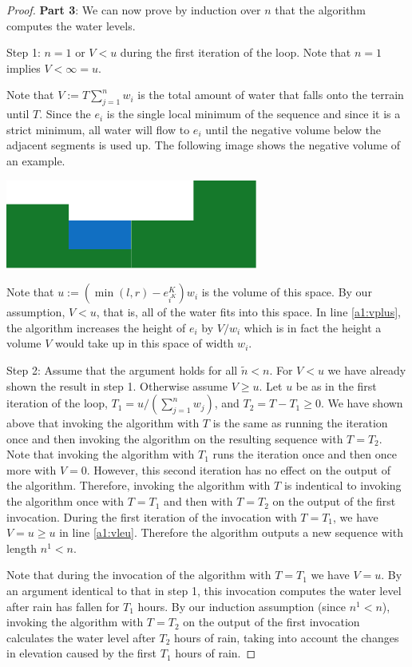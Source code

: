 \documentclass[11pt,a4paper]{article}
\begin{document}
\begin{proof}
\textbf{Part 3}: We can now prove by induction over $n$ that the algorithm computes the water levels.

Step 1: $n = 1$ or $V < u$ during the first iteration of the loop. Note that $n = 1$ implies $V < \infty = u$.

Note that $V := T\sum_{j=1}^n w_i$ is the total amount of water that falls onto the terrain until $T$.
Since the $e_i$ is the single local minimum of the sequence and since it is a strict minimum, all water will flow to $e_i$ until the negative volume below the adjacent segments is used up.
The following image shows the negative volume of an example.
\begin{center}
  \includegraphics{im6.pdf}
\end{center}
Note that $u := (\min(l, r)-e_{i^K}^K)w_i$ is the volume of this space.
By our assumption, $V < u$, that is, all of the water fits into this space.
In line \ref{a1:vplus}, the algorithm increases the height of $e_i$ by $V/w_i$ which is in fact the height a volume $V$ would take up in this space of width $w_i$.

Step 2: Assume that the argument holds for all $\tilde{n} < n$.
For $V < u$ we have already shown the result in step 1.
Otherwise assume $V \ge u$.
Let $u$ be as in the first iteration of the loop, $T_1 = u/(\sum_{j=1}^{n}w_j)$, and $T_2 = T - T_1 \ge 0$.
We have shown above that invoking the algorithm with $T$ is the same as running the iteration once and then invoking the algorithm on the resulting sequence with $T = T_2$.
Note that invoking the algorithm with $T_1$ runs the iteration once and then once more with $V = 0$.
However, this second iteration has no effect on the output of the algorithm.
Therefore, invoking the algorithm with $T$ is indentical to invoking the algorithm once with $T = T_1$ and then with $T = T_2$ on the output of the first invocation.
During the first iteration of the invocation with $T = T_1$, we have $V = u \ge u$ in line \ref{a1:vleu}.
Therefore the algorithm outputs a new sequence with length $n^1 < n$.

Note that during the invocation of the algorithm with $T = T_1$ we have $V = u$.
By an argument identical to that in step 1, this invocation computes the water level after rain has fallen for $T_1$ hours.
By our induction assumption (since $n^1 < n$), invoking the algorithm with $T = T_2$ on the output of the first invocation calculates the water level after $T_2$ hours of rain, taking into account the changes in elevation caused by the first $T_1$ hours of rain.


\end{proof}
\end{document}
